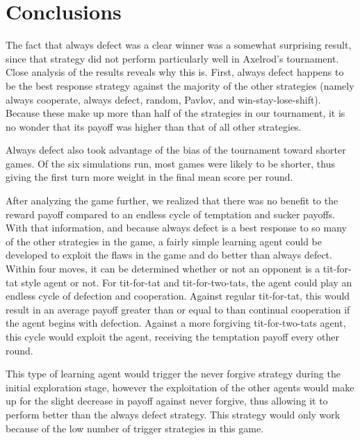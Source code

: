 \documentclass[a4paper]{article}
\begin{document}



\section{Conclusions}
The fact that always defect was a clear winner was a somewhat surprising result, since that strategy did not perform particularly well in Axelrod's tournament. Close analysis of the results reveals why this is. First, always defect happens to be the best response strategy against the majority of the other strategies (namely always cooperate, always defect, random, Pavlov, and win-stay-lose-shift). Because these make up more than half of the strategies in our tournament, it is no wonder that its payoff was higher than that of all other strategies.

Always defect also took advantage of the bias of the tournament toward shorter games. Of the six simulations run, most games were likely to be shorter, thus giving the first turn more weight in the final mean score per round.

After analyzing the game further, we realized that there was no benefit to the reward payoff compared to an endless cycle of temptation and sucker payoffs. With that information, and because always defect is a best response to so many of the other strategies in the game, a fairly simple learning agent could be developed to exploit the flaws in the game and do better than always defect. Within four moves, it can be determined whether or not an opponent is a tit-for-tat style agent or not. For tit-for-tat and tit-for-two-tats, the agent could play an endless cycle of defection and cooperation. Against regular tit-for-tat, this would result in an average payoff greater than or equal to than continual cooperation if the agent begins with defection. Against a more forgiving tit-for-two-tats agent, this cycle would exploit the agent, receiving the temptation payoff every other round.

This type of learning agent would trigger the never forgive strategy during the initial exploration stage, however the exploitation of the other agents would make up for the slight decrease in payoff against never forgive, thus allowing it to perform better than the always defect strategy. This strategy would only work because of the low number of trigger strategies in this game.
\end{document}
